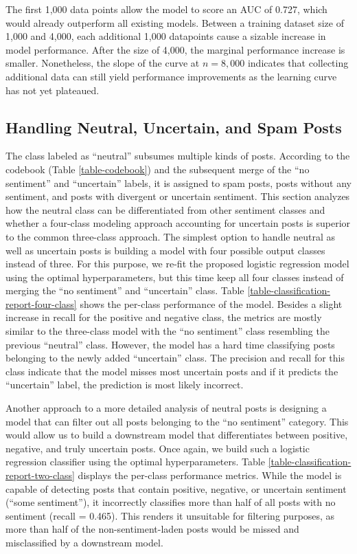 The first 1,000 data points allow the model to score an AUC of 0.727, which would already outperform all existing models. Between a training dataset size of 1,000 and 4,000, each additional 1,000 datapoints cause a sizable increase in model performance. After the size of 4,000, the marginal performance increase is smaller. Nonetheless, the slope of the curve at $n=8,000$ indicates that collecting additional data can still yield performance improvements as the learning curve has not yet plateaued. 

\subsection{Handling Neutral, Uncertain, and Spam Posts}
\label{section-post-hoc-classes}
The class labeled as ``neutral'' subsumes multiple kinds of posts. According to the codebook (Table \ref{table-codebook}) and the subsequent merge of the ``no sentiment'' and ``uncertain'' labels, it is assigned to spam posts, posts without any sentiment, and posts with divergent or uncertain sentiment. This section analyzes how the neutral class can be differentiated from other sentiment classes and whether a four-class modeling approach accounting for uncertain posts is superior to the common three-class approach.\newline
The simplest option to handle neutral as well as uncertain posts is building a model with four possible output classes instead of three. For this purpose, we re-fit the proposed logistic regression model using the optimal hyperparameters, but this time keep all four classes instead of merging the ``no sentiment'' and ``uncertain'' class. Table \ref{table-classification-report-four-class} shows the per-class performance of the model. Besides a slight increase in recall for the positive and negative class, the metrics are mostly similar to the three-class model with the ``no sentiment'' class resembling the previous ``neutral'' class. However, the model has a hard time classifying posts belonging to the newly added ``uncertain'' class. The precision and recall for this class indicate that the model misses most uncertain posts and if it predicts the ``uncertain'' label, the prediction is most likely incorrect.



Another approach to a more detailed analysis of neutral posts is designing a model that can filter out all posts belonging to the ``no sentiment'' category. This would allow us to build a downstream model that differentiates between positive, negative, and truly uncertain posts. Once again, we build such a logistic regression classifier using the optimal hyperparameters. Table \ref{table-classification-report-two-class} displays the per-class performance metrics. While the model is capable of detecting posts that contain positive, negative, or uncertain sentiment (``some sentiment''), it incorrectly classifies more than half of all posts with no sentiment (recall = 0.465). This renders it unsuitable for filtering purposes, as more than half of the non-sentiment-laden posts would be missed and misclassified by a downstream model.

